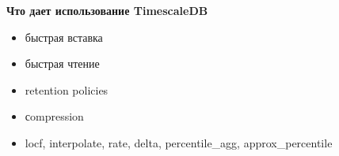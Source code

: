 \begin{frame}
  \bfseries Что дает использование TimescaleDB
  \normalfont
  \vspace{1em}
  \begin{itemize}[leftmargin=1em,itemsep=0.7em, label=\RNDSmarker]
    \item быстрая вставка
    \item быстрая чтение
    \item retention policies
    \item сompression
    \item locf, interpolate, rate, delta, percentile\_agg, approx\_percentile
  \end{itemize}
\end{frame}


